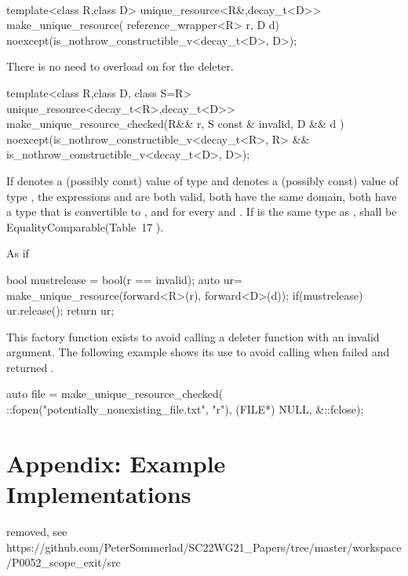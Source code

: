 \documentclass[ebook,11pt,article]{memoir}
\begin{document}
\begin{itemdescr}
\pnum
\returns \\
\end{itemdescr}


\begin{itemdecl}
template<class R,class D>
unique_resource<R&,decay_t<D>>
make_unique_resource( reference_wrapper<R> r, D d) 
noexcept(is_nothrow_constructible_v<decay_t<D>, D>);
\end{itemdecl}

\begin{itemdescr}
\pnum
\returns {}

\pnum \enternote There is no need to overload on  for the deleter. \exitnote
\end{itemdescr}



\begin{itemdecl}
template<class R,class D, class S=R>
unique_resource<decay_t<R>,decay_t<D>>
make_unique_resource_checked(R&& r, S const & invalid, D && d ) 
noexcept(is_nothrow_constructible_v<decay_t<R>, R> &&
         is_nothrow_constructible_v<decay_t<D>, D>);
\end{itemdecl}

\begin{itemdescr}
\pnum
\requires 
If  denotes a (possibly const) value of type  and  denotes a
(possibly const) value of type , the expressions  and 
are both valid, both have the same domain, both have a type that is
convertible to , and  for every  and
. If  is the same type as ,  shall be EqualityComparable(Table~17
). 

\pnum
\effects As if
\begin{codeblock}
  bool mustrelease = bool(r == invalid);
  auto ur= make_unique_resource(forward<R>(r), forward<D>(d));
  if(mustrelease) ur.release();
  return ur;
\end{codeblock}

\pnum
\enternote
This factory function exists to avoid calling a deleter function with an invalid argument. The following example shows its use to avoid calling  when  failed and returned .\\
\enterexample
\begin{codeblock}
		auto file = make_unique_resource_checked(
		      ::fopen("potentially_nonexisting_file.txt", "r"), 
		      (FILE*) NULL, 
		      &::fclose);
\end{codeblock}
\exitexample
\exitnote


\end{itemdescr}


\newpage
\chapter{Appendix: Example Implementations}
removed, see \\
https://github.com/PeterSommerlad/SC22WG21_Papers/tree/master/workspace/P0052_scope_exit/src
\end{document}
